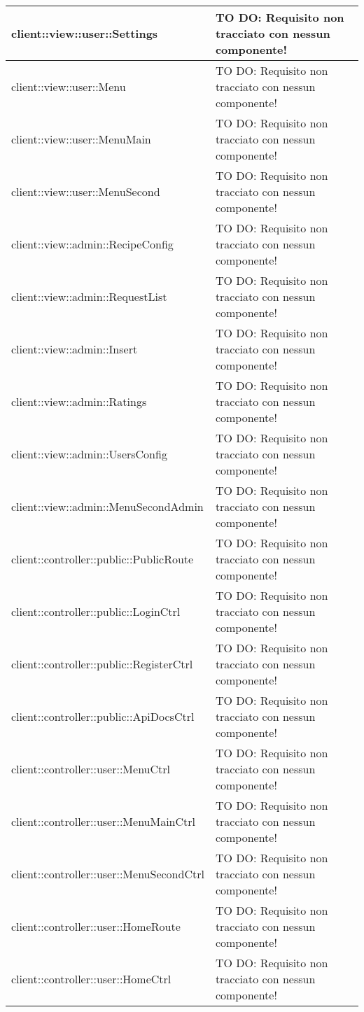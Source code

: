 \begin{center}
\begin{longtable}{| p{11cm} | p{2.5cm} |}
\hline
client::view::user::Settings & TO DO: Requisito non tracciato con nessun componente! \\
\hline
client::view::user::Menu & TO DO: Requisito non tracciato con nessun componente! \\
\hline
client::view::user::MenuMain & TO DO: Requisito non tracciato con nessun componente! \\
\hline
client::view::user::MenuSecond & TO DO: Requisito non tracciato con nessun componente! \\
\hline
client::view::admin::RecipeConfig & TO DO: Requisito non tracciato con nessun componente! \\
\hline
client::view::admin::RequestList & TO DO: Requisito non tracciato con nessun componente! \\
\hline
client::view::admin::Insert & TO DO: Requisito non tracciato con nessun componente! \\
\hline
client::view::admin::Ratings & TO DO: Requisito non tracciato con nessun componente! \\
\hline
client::view::admin::UsersConfig & TO DO: Requisito non tracciato con nessun componente! \\
\hline
client::view::admin::MenuSecondAdmin & TO DO: Requisito non tracciato con nessun componente! \\
\hline
client::controller::public::PublicRoute & TO DO: Requisito non tracciato con nessun componente! \\
\hline
client::controller::public::LoginCtrl & TO DO: Requisito non tracciato con nessun componente! \\
\hline
client::controller::public::RegisterCtrl & TO DO: Requisito non tracciato con nessun componente! \\
\hline
client::controller::public::ApiDocsCtrl & TO DO: Requisito non tracciato con nessun componente! \\
\hline
client::controller::user::MenuCtrl & TO DO: Requisito non tracciato con nessun componente! \\
\hline
client::controller::user::MenuMainCtrl & TO DO: Requisito non tracciato con nessun componente! \\
\hline
client::controller::user::MenuSecondCtrl & TO DO: Requisito non tracciato con nessun componente! \\
\hline
client::controller::user::HomeRoute & TO DO: Requisito non tracciato con nessun componente! \\
\hline
client::controller::user::HomeCtrl & TO DO: Requisito non tracciato con nessun componente! \\

\end{longtable}
\end{center}
